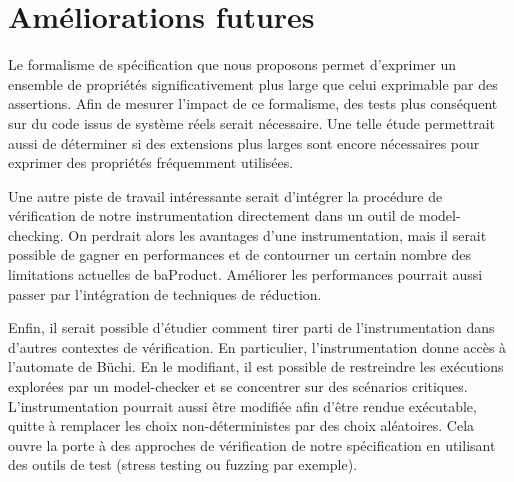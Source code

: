 
\section{Améliorations futures}

Le formalisme de spécification que nous proposons permet d'exprimer un ensemble
de propriétés significativement plus large que celui exprimable par des
assertions. Afin de mesurer l'impact de ce formalisme, des tests plus conséquent
sur du code issus de système réels serait nécessaire. Une telle étude
permettrait aussi de déterminer si des extensions plus larges sont encore
nécessaires pour exprimer des propriétés fréquemment utilisées.

Une autre piste de travail intéressante serait d'intégrer la procédure de
vérification de notre instrumentation directement dans un outil de
model-checking. On perdrait alors les avantages d'une instrumentation, mais il
serait possible de gagner en performances et de contourner un certain nombre des
limitations actuelles de baProduct. Améliorer les performances pourrait aussi
passer par l'intégration de techniques de réduction.

Enfin, il serait possible d'étudier comment tirer parti de l'instrumentation dans
d'autres contextes de vérification. En particulier, l'instrumentation donne
accès à l'automate de Büchi. En le modifiant, il est possible de restreindre les
exécutions explorées par un model-checker et se concentrer sur des scénarios
critiques. L'instrumentation pourrait aussi être modifiée afin d'être rendue
exécutable, quitte à remplacer les choix non-déterministes par des choix
aléatoires. Cela ouvre la porte à des approches de vérification de notre
spécification en utilisant des outils de test (stress testing ou fuzzing par
exemple).